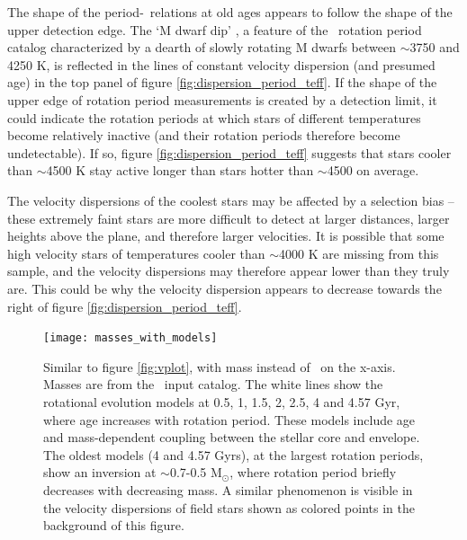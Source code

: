 The shape of the period-\teff\ relations at old ages appears to follow the
shape of the upper detection edge.
The `M dwarf dip' \citep{vansaders2018}, a feature of the \mct\ rotation
period catalog characterized by a dearth of slowly rotating M dwarfs between
$\sim$3750 and 4250 K, is reflected in the lines of constant velocity
dispersion (and presumed age) in the top panel of figure
\ref{fig:dispersion_period_teff}.
If the shape of the upper edge of rotation period measurements is created by a
detection limit, it could indicate the rotation periods at which stars of
different temperatures become relatively inactive (and their rotation periods
therefore become undetectable).
If so, figure \ref{fig:dispersion_period_teff} suggests that stars cooler than
$\sim$4500 K stay active longer than stars hotter than $\sim$4500 on average.


The velocity dispersions of the coolest stars may be affected by a selection
bias -- these extremely faint stars are more difficult to detect at larger
distances, larger heights above the plane, and therefore larger velocities.
It is possible that some high velocity stars of temperatures cooler than
$\sim$4000 K are missing from this sample, and the velocity dispersions may
therefore appear lower than they truly are.
This could be why the velocity dispersion appears to decrease towards the
right of figure \ref{fig:dispersion_period_teff}.

\begin{figure}
  \caption{
    Similar to figure \ref{fig:vplot}, with mass instead of \teff\ on the
    x-axis.
    Masses are from the \kepler\ input catalog.
    The white lines show the \citet{spada2019} rotational evolution models at
    0.5, 1, 1.5, 2, 2.5, 4 and 4.57 Gyr, where age increases with rotation
    period.
    These models include age and mass-dependent coupling between the stellar
    core and envelope.
    The oldest models (4 and 4.57 Gyrs), at the largest rotation periods, show
    an inversion at $\sim$0.7-0.5 M$_\odot$, where rotation period briefly
    decreases with decreasing mass.
    A similar phenomenon is visible in the velocity dispersions of field stars
    shown as colored points in the background of this figure.
}
  \centering
    \texttt{[image: masses\_with\_models]}
\label{fig:masses_with_models}
\end{figure}

